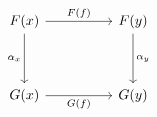 \[\begin{tikzcd}
	{F(x)} && {F(y)} \\
	\\
	{G(x)} && {G(y)}
	\arrow["{F(f)}", from=1-1, to=1-3]
	\arrow["{\alpha_{x}}"', from=1-1, to=3-1]
	\arrow["{\alpha_{y}}", from=1-3, to=3-3]
	\arrow["{G(f)}"', from=3-1, to=3-3]
\end{tikzcd}\]
